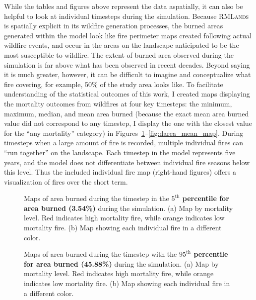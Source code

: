 While the tables and figures above represent the data aspatially, it can also be helpful to look at individual timesteps during the simulation. Because \textsc{RMLands} is spatially explicit in its wildfire generation processes, the burned areas generated within the model look like fire perimeter maps created following actual wildfire events, and occur in the areas on the landscape anticipated to be the most susceptible to wildfire. The extent of burned area observed during the simulation is far above what has been observed in recent decades. Beyond saying it is much greater, however, it can be difficult to imagine and conceptualize what fire covering, for example, 50\% of the study area looks like. To facilitate understanding of the statistical outcomes of this work, I created maps displaying the mortality outcomes from wildfires at four key timesteps: the minimum, maximum, median, and mean area burned (because the exact mean area burned value did not correspond to any timestep, I display the one with the closest value for the ``any mortality'' category) in Figures~\ref{fig:darea_min_map}--\ref{fig:darea_mean_map}. During timesteps when a large amount of fire is recorded, multiple individual fires can ``run together'' on the landscape. Each timestep in the model represents five years, and the model does not differentiate between individual fire seasons below this level. Thus the included individual fire map (right-hand figures) offers a visualization of fires over the short term.

\newpage

\begin{figure}[!htbp]
  \centering
  \caption{Maps of area burned during the timestep in the \textbf{$5^{\text{th}}$ percentile for area burned (3.54\%)} during the simulation. (a) Map by mortality level. Red indicates high mortality fire, while orange indicates low mortality fire. (b) Map showing each individual fire in a different color.}
  \label{fig:darea_min_map}
\end{figure}

\begin{figure}[!htbp]
  \centering
  \caption{Maps of area burned during the timestep with the \textbf{$95^{\text{th}}$ percentile for area burned (45.88\%)} during the simulation. (a) Map by mortality level. Red indicates high mortality fire, while orange indicates low mortality fire. (b) Map showing each individual fire in a different color.}
  \label{fig:darea_max_map}
\end{figure}

